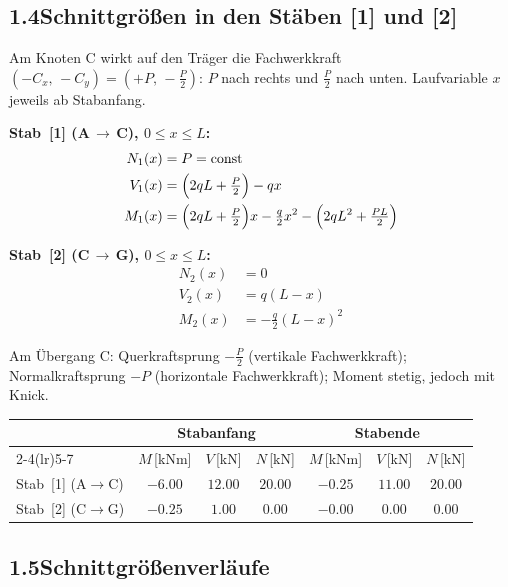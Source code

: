 \documentclass[a4paper,11pt]{article}
\begin{document}
\subsection*{1.4\quad Schnittgrößen in den Stäben [1] und [2]}

Am Knoten C wirkt auf den Träger die Fachwerkkraft
$(-C_x,\,-C_y) = (+P,\,-\tfrac{P}{2})$:
$P$ nach rechts und $\tfrac{P}{2}$ nach unten.
Laufvariable $x$ jeweils ab Stabanfang.

\textbf{Stab~[1] (A\,$\to$\,C), $0 \le x \le L$:}
\begin{align*}
  N_1(x) &= P = \text{const} \\
  V_1(x) &= \Bigl(2qL + \tfrac{P}{2}\Bigr) - qx \\
  M_1(x) &= \Bigl(2qL + \tfrac{P}{2}\Bigr)x - \tfrac{q}{2}x^2
            - \Bigl(2qL^2 + \tfrac{PL}{2}\Bigr)
\end{align*}

\textbf{Stab~[2] (C\,$\to$\,G), $0 \le x \le L$:}
\begin{align*}
  N_2(x) &= 0 \\
  V_2(x) &= q(L - x) \\
  M_2(x) &= -\tfrac{q}{2}(L - x)^2
\end{align*}

Am Übergang C: Querkraftsprung $-\tfrac{P}{2}$ (vertikale Fachwerkkraft);
Normalkraftsprung $-P$ (horizontale Fachwerkkraft); Moment stetig, jedoch mit Knick.

\medskip
\begin{center}
\begin{tabular}{l cccccc}
\toprule
 & \multicolumn{3}{c}{\textbf{Stabanfang}} & \multicolumn{3}{c}{\textbf{Stabende}} \\
\cmidrule(lr){2-4}\cmidrule(lr){5-7}
 & $M$\,[kNm] & $V$\,[kN] & $N$\,[kN]
 & $M$\,[kNm] & $V$\,[kN] & $N$\,[kN] \\
\midrule
Stab~[1] (A$\to$C) & $-6.00$ & $12.00$ & $20.00$ & $-0.25$ & $11.00$ & $20.00$ \\[3pt]
Stab~[2] (C$\to$G) & $-0.25$ & $1.00$ & $0.00$ & $-0.00$ & $0.00$ & $0.00$ \\
\bottomrule
\end{tabular}
\end{center}

\subsection*{1.5\quad Schnittgrößenverläufe}


\end{document}
